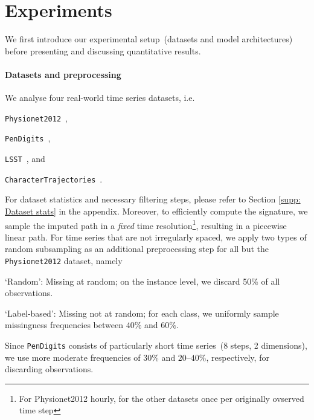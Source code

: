 \documentclass{article}
\begin{document}


\section{Experiments}

We first introduce our experimental setup~(datasets and model
architectures) before presenting and discussing quantitative results.

\paragraph{Datasets and preprocessing}

We analyse four real-world time series datasets, i.e.\
%
\begin{inparaenum}[(i)]
  \item \texttt{Physionet2012}~\citep{goldberger2000physiobank},
  \item \texttt{PenDigits}~\citep{Dua2019},
  \item \texttt{LSST}~\citep{allam2018photometric}, and
  \item \texttt{CharacterTrajectories}~\citep{Dua2019}.
\end{inparaenum}
%
For dataset statistics and necessary filtering steps, please refer to Section \ref{supp: Dataset stats} in the appendix.
Moreover, to efficiently compute the signature, we
sample the imputed path in a \emph{fixed} time resolution\footnote{For Physionet2012 hourly, for the other datasets once per originally ovserved time step}, resulting in
a piecewise linear path.
%
For time series that are not irregularly spaced, we apply two types of random subsampling as an additional
preprocessing step for all but the \texttt{Physionet2012} dataset,
namely
%
\begin{inparaenum}[(1)]
    \item `Random': Missing at random; on the instance level, we discard 50\% of all observations.
    \item `Label-based': Missing not at random; for each
      class, we uniformly sample missingness frequencies between $40\%$
      and $60\%$.
\end{inparaenum}
%
Since \texttt{PenDigits} consists of particularly short time series~(8
steps, 2 dimensions), we use more moderate frequencies of $30\%$
and $20$--$40\%$, respectively, for discarding observations.
\end{document}
